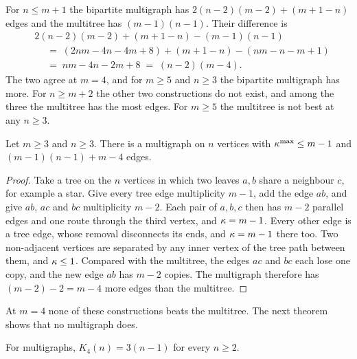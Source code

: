 For $n \le m+1$ the bipartite multigraph has $2(n-2)(m-2) + (m+1-n)$ edges and the multitree has $(m-1)(n-1)$. Their difference is
\[
\begin{aligned}
    &2(n-2)(m-2) + (m+1-n) - (m-1)(n-1) \\
    &\quad\;=\; (2nm-4n-4m+8) + (m+1-n) - (nm-n-m+1) \\
    &\quad\;=\; nm-4n-2m+8 \;=\; (n-2)(m-4).
\end{aligned}
\] The two agree at $m=4$, and for $m\ge5$ and $n\ge3$ the bipartite multigraph has more.
For $n \ge m+2$ the other two constructions do not exist, and among the three the multitree has the most edges.
For $m\ge5$ the multitree is not best at any $n \ge 3$.

\begin{proposition}\label{prop:multi-triangle}
Let $m \ge 3$ and $n \ge 3$. There is a multigraph on $n$ vertices with $\kappa^{\max} \le m-1$ and $(m-1)(n-1) + m-4$ edges.
\end{proposition}

\begin{proof}
Take a tree on the $n$ vertices in which two leaves $a,b$ share a neighbour $c$, for example a star. Give every tree edge multiplicity $m-1$, add the edge $ab$, and give $ab$, $ac$ and $bc$ multiplicity $m-2$.
Each pair of $a,b,c$ then has $m-2$ parallel edges and one route through the third vertex, and $\kappa=m-1$.
Every other edge is a tree edge, whose removal disconnects its ends, and $\kappa=m-1$ there too.
Two non-adjacent vertices are separated by any inner vertex of the tree path between them, and $\kappa\le1$.
Compared with the multitree, the edges $ac$ and $bc$ each lose one copy, and the new edge $ab$ has $m-2$ copies. The multigraph therefore has $(m-2)-2=m-4$ more edges than the multitree.
\end{proof}

At $m=4$ none of these constructions beats the multitree. The next theorem shows that no multigraph does.

\begin{theorem}[The multigraph vertex value at $m = 4$]\label{thm:multi-vertex-m4}
For multigraphs, $K_4(n) = 3(n-1)$ for every $n \ge 2$.
\end{theorem}

